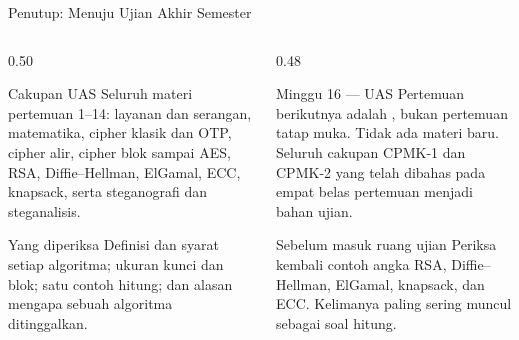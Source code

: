 \documentclass[aspectratio=169,11pt]{beamer}
\begin{document}
\begin{frame}{Penutup: Menuju Ujian Akhir Semester}
    \footnotesize
    \begin{columns}[T,onlytextwidth]
        \begin{column}{0.50\textwidth}
            \begin{block}{Cakupan UAS}
                Seluruh materi pertemuan 1--14: layanan dan serangan,
                matematika, cipher klasik dan OTP, cipher alir, cipher blok
                sampai AES, RSA, Diffie--Hellman, ElGamal, ECC, knapsack, serta
                steganografi dan steganalisis.
            \end{block}
            \begin{exampleblock}{Yang diperiksa}
                \footnotesize
                Definisi dan syarat setiap algoritma; ukuran kunci dan blok;
                satu contoh hitung; dan alasan mengapa sebuah algoritma
                ditinggalkan.
            \end{exampleblock}
        \end{column}
        \begin{column}{0.48\textwidth}
            \begin{alertblock}{Minggu 16 --- UAS}
                Pertemuan berikutnya adalah , bukan pertemuan tatap
                muka. Tidak ada materi baru. Seluruh cakupan CPMK-1 dan CPMK-2
                yang telah dibahas pada empat belas pertemuan menjadi bahan
                ujian.
            \end{alertblock}
            \begin{block}{Sebelum masuk ruang ujian}
                \footnotesize
                Periksa kembali contoh angka RSA, Diffie--Hellman, ElGamal,
                knapsack, dan ECC. Kelimanya paling sering muncul sebagai soal
                hitung.
            \end{block}
        \end{column}
    \end{columns}
\end{frame}
\end{document}
